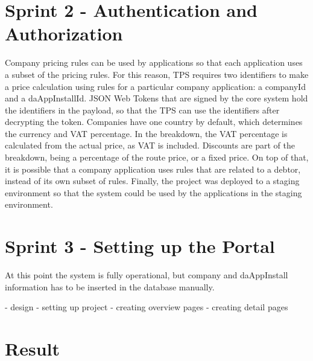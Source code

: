 %
\section{Sprint 2 - Authentication and Authorization}
Company pricing rules can be used by applications so that each application uses a subset of the pricing rules. For this reason, TPS requires two identifiers to make a price calculation using rules for a particular company application: a companyId and a daAppInstallId. JSON Web Tokens that are signed by the core system hold the identifiers in the payload, so that the TPS can use the identifiers after decrypting the token. Companies have one country by default, which determines the currency and VAT percentage. In the breakdown, the VAT percentage is calculated from the actual price, as VAT is included. Discounts are part of the breakdown, being a percentage of the route price, or a fixed price. On top of that, it is possible that a company application uses rules that are related to a debtor, instead of its own subset of rules. Finally, the project was deployed to a staging environment so that the system could be used by the applications in the staging environment.

%
\section{Sprint 3 - Setting up the Portal}
At this point the system is fully operational, but company and daAppInstall information has to be inserted in the database manually.

- design
- setting up project
- creating overview pages
- creating detail pages

%
\section{Result}